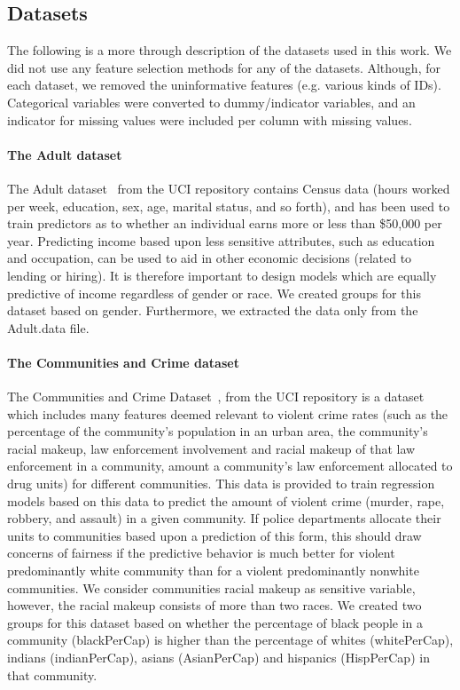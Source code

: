\subsection{Datasets}
\label{sec:data-description}
The following is a more through description of the datasets used in this work.
We did not use any feature selection methods for any of the datasets. Although, for each dataset, 
we removed the uninformative features (e.g. various kinds of IDs). Categorical variables were converted 
to dummy/indicator variables, and an indicator for missing values were included per column with missing values.

\paragraph{The Adult dataset}
The Adult dataset~\citep{adult-dataset, uci-repo} from the UCI
repository contains Census data (hours worked per
week, education, sex, age, marital status, and so forth), and has been
used to train predictors as to whether an individual earns more or
less than \$50,000 per year. Predicting income based upon less
sensitive attributes, such as education and occupation, can be used to
aid in other economic decisions (related to lending or hiring). It is
therefore important to design models which are equally predictive of
income regardless of gender or race. We created groups for this dataset based
on gender. Furthermore, we extracted the data only from the Adult.data file.

\paragraph{The Communities and Crime dataset}
The Communities and Crime Dataset~\citep{communities-crime-dataset,
  uci-repo}, from the UCI repository is a dataset which includes many
features deemed relevant to violent crime rates (such as the
percentage of the community's population in an urban area, the
community's racial makeup, law enforcement involvement and racial
makeup of that law enforcement in a community, amount a community's
law enforcement allocated to drug units) for different
communities. This data is provided to train regression models based on
this data to predict the amount of violent crime (murder, rape,
robbery, and assault) in a given community. If police departments
allocate their units to communities based upon a prediction of this
form, this should draw concerns of fairness if the predictive behavior
is much better for violent predominantly white community than for a
violent predominantly nonwhite communities.  We consider communities
racial makeup as sensitive variable, however, the racial makeup
consists of more than two races.  We created two groups for this
dataset based on whether the percentage of black people in a community
(blackPerCap) is higher than the percentage of whites (whitePerCap),
indians (indianPerCap), asians (AsianPerCap) and hispanics
(HispPerCap) in that community.


